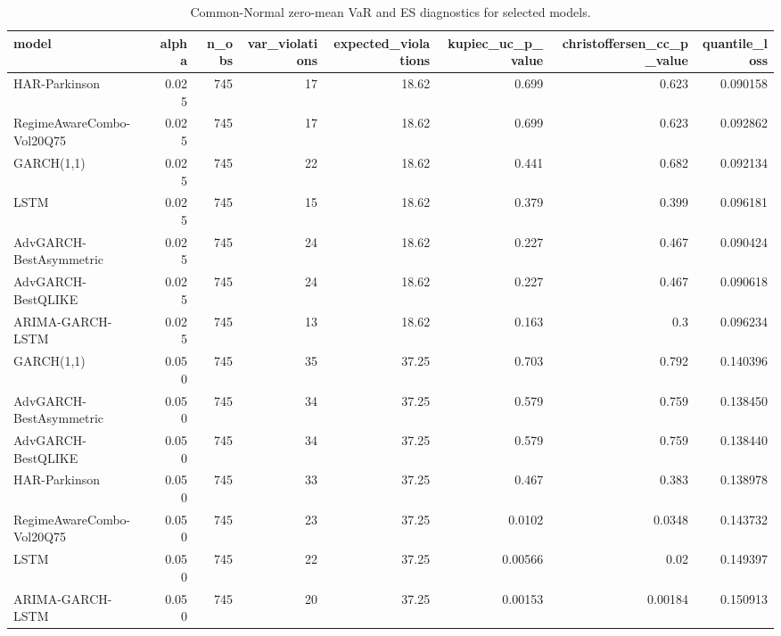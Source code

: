 \begin{table}[!t]
\centering
\caption{Common-Normal zero-mean VaR and ES diagnostics for selected models.}
\label{tab:common-distribution-var-es-main}
\scriptsize
\begin{tabular}{@{}lrrrrrrr@{}}
\toprule
model & alpha & n\_obs & var\_violations & expected\_violations & kupiec\_uc\_p\_value & christoffersen\_cc\_p\_value & quantile\_loss \\
\midrule
HAR-Parkinson & 0.025 & 745 & 17 & 18.62 & 0.699 & 0.623 & 0.090158 \\
RegimeAwareCombo-Vol20Q75 & 0.025 & 745 & 17 & 18.62 & 0.699 & 0.623 & 0.092862 \\
GARCH(1,1) & 0.025 & 745 & 22 & 18.62 & 0.441 & 0.682 & 0.092134 \\
LSTM & 0.025 & 745 & 15 & 18.62 & 0.379 & 0.399 & 0.096181 \\
AdvGARCH-BestAsymmetric & 0.025 & 745 & 24 & 18.62 & 0.227 & 0.467 & 0.090424 \\
AdvGARCH-BestQLIKE & 0.025 & 745 & 24 & 18.62 & 0.227 & 0.467 & 0.090618 \\
ARIMA-GARCH-LSTM & 0.025 & 745 & 13 & 18.62 & 0.163 & 0.3 & 0.096234 \\
GARCH(1,1) & 0.050 & 745 & 35 & 37.25 & 0.703 & 0.792 & 0.140396 \\
AdvGARCH-BestAsymmetric & 0.050 & 745 & 34 & 37.25 & 0.579 & 0.759 & 0.138450 \\
AdvGARCH-BestQLIKE & 0.050 & 745 & 34 & 37.25 & 0.579 & 0.759 & 0.138440 \\
HAR-Parkinson & 0.050 & 745 & 33 & 37.25 & 0.467 & 0.383 & 0.138978 \\
RegimeAwareCombo-Vol20Q75 & 0.050 & 745 & 23 & 37.25 & 0.0102 & 0.0348 & 0.143732 \\
LSTM & 0.050 & 745 & 22 & 37.25 & 0.00566 & 0.02 & 0.149397 \\
ARIMA-GARCH-LSTM & 0.050 & 745 & 20 & 37.25 & 0.00153 & 0.00184 & 0.150913 \\
\bottomrule
\end{tabular}
\end{table}
